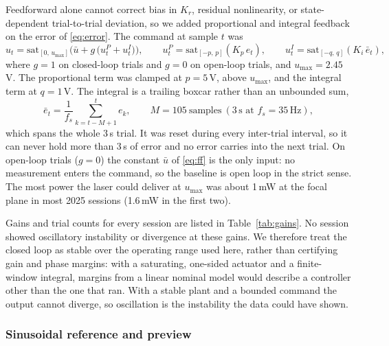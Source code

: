 Feedforward alone cannot correct bias in $K_r$, residual nonlinearity, or
state-dependent trial-to-trial deviation, so we added proportional and integral
feedback on the error of \eqref{eq:error}. The command at sample $t$ was
%
\begin{equation}
    u_{t} = \mathrm{sat}_{[0,\,u_{\max}]}
            \Big(\bar{u} + g\,\big(u^{P}_{t} + u^{I}_{t}\big)\Big),
    \qquad
    u^{P}_{t} = \mathrm{sat}_{[-p,\,p]}\!\left(K_{p}\,e_{t}\right),
    \qquad
    u^{I}_{t} = \mathrm{sat}_{[-q,\,q]}\!\left(K_{i}\,\bar{e}_{t}\right),
    \label{eq:pi}
\end{equation}
%
where $g = 1$ on closed-loop trials and $g = 0$ on open-loop trials, and
$u_{\max} = 2.45$\,V. The proportional term was clamped at $p = 5$\,V, above
$u_{\max}$, and the integral term at $q = 1$\,V. The integral is a trailing
boxcar rather than an unbounded sum,
%
\begin{equation}
    \bar{e}_{t} = \frac{1}{f_{s}}\sum_{k = t - M + 1}^{t} e_{k},
    \qquad M = 105 \ \text{samples} \ (3\,\text{s at } f_s = 35\,\text{Hz}),
    \label{eq:integral}
\end{equation}
%
which spans the whole 3\,s trial. It was reset during every inter-trial
interval, so it can never hold more than 3\,s of error and no error carries
into the next trial. On open-loop trials ($g = 0$) the constant $\bar u$ of
\eqref{eq:ff} is the only input: no measurement enters the command, so the
baseline is open loop in the strict sense. The most power the laser could
deliver at $u_{\max}$ was about 1\,mW at the focal plane in most 2025 sessions
(1.6\,mW in the first two).

Gains and trial counts for every session are listed in
Table~\ref{tab:gains}. No session showed oscillatory instability or divergence
at these gains. We therefore treat the closed loop as stable over the operating
range used here, rather than certifying gain and phase margins: with a
saturating, one-sided actuator and a finite-window integral, margins from a
linear nominal model would describe a controller other than the one that ran.
With a stable plant and a bounded command the output cannot diverge, so
oscillation is the instability the data could have shown.

\subsubsection*{Sinusoidal reference and preview}

